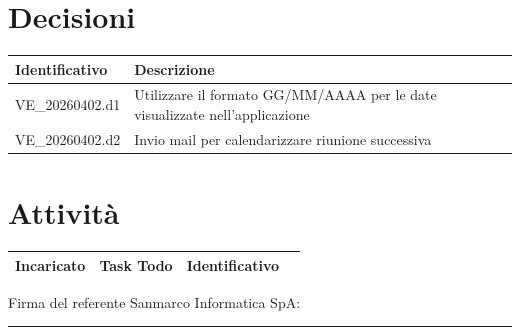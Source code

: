 \documentclass[a4paper,12pt]{article}
\begin{document}
    \section{Decisioni}
        \begin{tabularx}{\textwidth}{|l|X|}
            \hline
            \textbf{Identificativo} & \textbf{Descrizione} \\
            \hline
            VE\_20260402.d1 & Utilizzare il formato GG/MM/AAAA per le date visualizzate nell'applicazione \\
            \hline
            VE\_20260402.d2 & Invio mail per calendarizzare riunione successiva \\
            \hline
        \end{tabularx}

    \section{Attività}
        \begin{tabularx}{\textwidth}{|l|X|l|l|}
            \hline
            \textbf{Incaricato} & \textbf{Task Todo} & \textbf{Identificativo} \\
            \hline
        \end{tabularx}

    \bigskip
    \bigskip
    \bigskip
    \bigskip

    \noindent Firma del referente Sanmarco Informatica SpA: \rule{6cm}{0.4pt}
\end{document}
